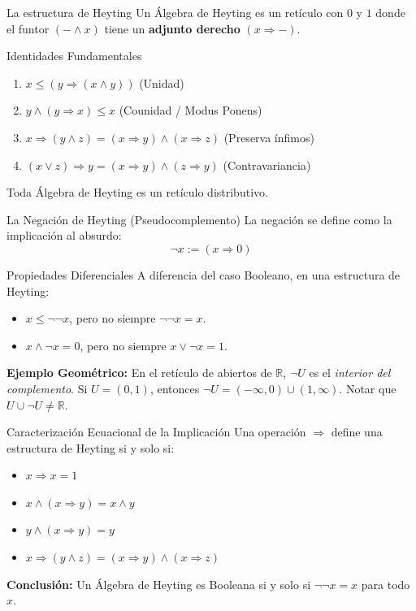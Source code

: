 \documentclass{beamer}
\begin{document}
\begin{frame}{La estructura de Heyting}
    Un Álgebra de Heyting es un retículo con $0$ y $1$ donde el funtor $( - \wedge x)$ tiene un \textbf{adjunto derecho} $(x \Rightarrow -)$.
    
    \begin{block}{Identidades Fundamentales}
    \begin{enumerate}
        \item $x \leq (y \Rightarrow (x \wedge y))$ (Unidad)
        \item $y \wedge (y \Rightarrow x) \leq x$ (Counidad / Modus Ponens)
        \item $x \Rightarrow (y \wedge z) = (x \Rightarrow y) \wedge (x \Rightarrow z)$ (Preserva ínfimos)
        \item $(x \vee z) \Rightarrow y = (x \Rightarrow y) \wedge (z \Rightarrow y)$ (Contravariancia)
    \end{enumerate}
    \end{block}
    
     Toda Álgebra de Heyting es un retículo distributivo.
\end{frame}

\begin{frame}{La Negación de Heyting (Pseudocomplemento)}
    La negación se define como la implicación al absurdo:
    \[ \neg x := (x \Rightarrow 0) \]
    
    \begin{alertblock}{Propiedades Diferenciales}
    A diferencia del caso Booleano, en una estructura de Heyting:
    \begin{itemize}
        \item $x \leq \neg \neg x$, pero no siempre $\neg \neg x = x$.
        \item $x \wedge \neg x = 0$, pero no siempre $x \vee \neg x = 1$.
    \end{itemize}
    \end{alertblock}

    \textbf{Ejemplo Geométrico:} En el retículo de abiertos de $\mathbb{R}$, $\neg U$ es el \textit{interior del complemento}. Si $U = (0,1)$, entonces $\neg U = (-\infty, 0) \cup (1, \infty)$. Notar que $U \cup \neg U \neq \mathbb{R}$.
\end{frame}

\begin{frame}{Caracterización Ecuacional de la Implicación}
    Una operación $\Rightarrow$ define una estructura de Heyting si y solo si:
    \begin{itemize}
        \item $x \Rightarrow x = 1$
        \item $x \wedge (x \Rightarrow y) = x \wedge y$
        \item $y \wedge (x \Rightarrow y) = y$
        \item $x \Rightarrow (y \wedge z) = (x \Rightarrow y) \wedge (x \Rightarrow z)$
    \end{itemize}
    \vfill
    \begin{center}
        \textbf{Conclusión:} Un Álgebra de Heyting es Booleana si y solo si $\neg \neg x = x$ para todo $x$.
    \end{center}
\end{frame}
\end{document}
